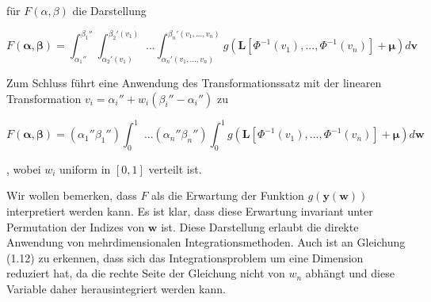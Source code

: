 \documentclass[12pt,a4paper]{scrartcl}
\numberwithin{equation}{section}
\begin{document}
für $F(\alpha,\beta)$ die Darstellung

\begin{equation}
  F(\mathbf{\alpha},\mathbf{\beta}) = \int_{\alpha_1''}^{\beta_1''} \int_{\alpha_2'(v_1)}^{\beta_2'(v_1)} \text{ ...} \int_{\alpha_n'(v_1,...,v_n)}^{\beta_n'(v_1,...,v_n)} g(\mathbf{L}[\Phi^{-1}(v_1),...,\Phi^{-1}(v_n)] + \mathbf{\mu}) d\mathbf{v}
\end{equation}

Zum Schluss führt eine Anwendung des Transformationssatz mit der linearen Transformation $v_i = \alpha_i'' + w_i(\beta_i''-\alpha_i'')$ zu

\begin{equation}
  F(\mathbf{\alpha},\mathbf{\beta}) = (\alpha_1'' \beta_1'') \int_{0}^{1} \text{ ...}(\alpha_n'' \beta_n'') \int_{0}^{1} g(\mathbf{L}[\Phi^{-1}(v_1),...,\Phi^{-1}(v_n)] + \mathbf{\mu}) d\mathbf{w}
\end{equation}

, wobei $w_i$ uniform in $[0,1]$ verteilt ist.

Wir wollen bemerken, dass $F$ als die Erwartung der Funktion $g(\mathbf{y(w)})$ interpretiert werden kann. Es ist klar, dass diese Erwartung invariant unter Permutation der Indizes
von $\mathbf{w}$ ist. Diese Darstellung erlaubt die direkte Anwendung von mehrdimensionalen Integrationsmethoden.
Auch ist an Gleichung (1.12) zu erkennen, dass sich das Integrationsproblem um eine Dimension
reduziert hat, da die rechte Seite der Gleichung nicht von $w_n$ abhängt und diese Variable daher
herausintegriert werden kann.
 
\end{document}
